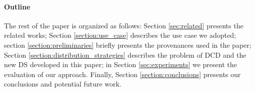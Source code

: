 \paragraph{\textbf{Outline}} The rest of the paper is organized as follows:
Section \ref{sec:related} presents the related works; Section \ref{section:use_case} describes the use case we adopted; section \ref{section:preliminaries} briefly presents the provenances used in the paper; Section \ref{section:distribution_strategies} describes the problem of DCD and the new DS developed in this paper; in Section \ref{sec:experiments} we present the evaluation of our approach. Finally, Section \ref{section:conclusions} presents our conclusions and potential future work.



 

